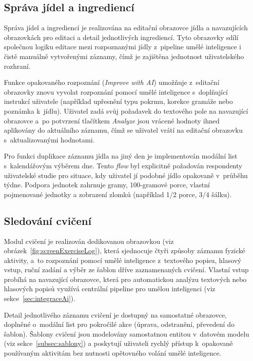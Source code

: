 \subsection{Správa jídel a ingrediencí}
\label{subsec:spravaJidel}

Správa jídel a ingrediencí je realizována na editační obrazovce jídla a navazujících obrazovkách pro editaci a detail jednotlivých ingrediencí.
Tyto obrazovky sdílí společnou logiku editace mezi rozpoznanými jídly z~pipeline umělé inteligence i čistě manuálně vytvořenými záznamy, čímž je zajištěna jednotnost uživatelského rozhraní.

Funkce opakovaného rozpoznání (\emph{Improve with AI}) umožňuje z~editační obrazovky znovu vyvolat rozpoznání pomocí umělé inteligence s~doplňující instrukcí uživatele (například upřesnění typu pokrmu, korekce gramáže nebo poznámka k~jídlu).
Uživatel zadá svůj požadavek do textového pole na navazující obrazovce a~po potvrzení tlačítkem \emph{Analyze} jsou vrácené hodnoty ihned aplikovány do aktuálního záznamu, čímž se uživatel vrátí na editační obrazovku s~aktualizovanými hodnotami.

Pro funkci duplikace záznamu jídla na jiný den je implementován modální list s~kalendářovým výběrem dne.
Tento \emph{flow} byl explicitně požadován respondenty uživatelské studie pro situace, kdy uživatel jí podobné jídlo opakovaně v~průběhu týdne.
Podpora jednotek zahrnuje gramy, 100-gramové porce, vlastní pojmenované jednotky a zobrazení zlomků (například 1/2 porce, 3/4 šálku).

\subsection{Sledování cvičení}
\label{subsec:sledovaniCviceni}

Modul cvičení je realizován dedikovanou obrazovkou (viz obrázek~\ref{fig:screenExerciseLog}), která sjednocuje čtyři způsoby záznamu fyzické aktivity, a~to rozpoznání pomocí umělé inteligence z~textového popisu, hlasový vstup, ruční zadání a výběr ze šablon dříve zaznamenaných cvičení.
Vlastní vstup probíhá na navazující obrazovce, která pro automatickou analýzu textových nebo hlasových popisů využívá centrální pipeline pro umělou inteligenci (viz sekce~\ref{sec:integraceAi}).

Detail jednotlivého záznamu cvičení je dostupný na samostatné obrazovce, doplněné o~modální list pro pokročilé akce (úprava, odstranění, převedení do šablon).
Šablony cvičení jsou modelovány samostatnou entitou v~datovém modelu (viz sekce~\ref{subsec:sablony}) a poskytují uživateli rychlý přístup k~opakovaně používaným aktivitám bez nutnosti opětovného volání umělé inteligence.

